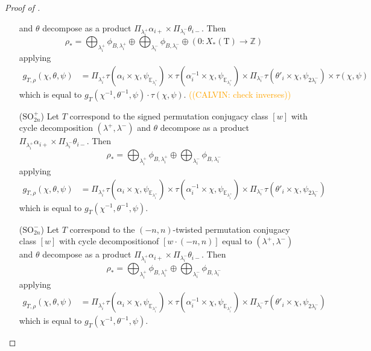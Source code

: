 \documentclass[12pt, reqno]{amsart}
\theoremstyle{definition}
\theoremstyle{definition}
\theoremstyle{definition}
\newcommand{\fieldCharacter}{\psi}
\newcommand{\quadraticExtension}{\mathbb{E}}
\newcommand{\quadraticFieldExtension}[1]{\quadraticExtension_{#1}}
\newcommand{\GaussSumCharacter}[3]{\tau\left(#1 \times #2, #3\right)}
\newcommand{\algebraicGroup}[1]{\boldsymbol{\mathrm{#1}}}
\newcommand{\calvin}[1]{\textcolor{orange}{\sffamily ((CALVIN: #1))}}
\begin{document}
\begin{proof}[Proof of ]
\begin{enumerate}
	and $\theta$ decompose as a product $\Pi_{\lambda_i^+ }\alpha_{i+} \times \Pi_{\lambda_i^-}\theta_{i-}$. Then
	$$\rho_* = \bigoplus_{\lambda_i^+} \phi_{B,\lambda_i^+} \oplus \bigoplus_{\lambda_i^-} \phi_{B,\lambda_i^-} \oplus \left(0:X_*(\algebraicGroup{T}) \to \mathbb{Z}\right)$$
	applying 
	\begin{align*}
		g_{T,\rho}(\chi,\theta,\psi) &= \Pi_{\lambda_i^+} \GaussSumCharacter{\alpha_i}{\chi}{\fieldCharacter_{\quadraticFieldExtension{\lambda_i^+}}} \times \GaussSumCharacter{\alpha_i^{-1}}{\chi}{\fieldCharacter_{\quadraticFieldExtension{\lambda_i^+}}} \times \Pi_{\lambda_i^-} \GaussSumCharacter{\theta'_i}{\chi}{\fieldCharacter_{2\lambda_i^-}} \times \tau(\chi,\psi)
	\end{align*}
	which is equal to $g_{T}(\chi^{-1},\theta^{-1},\psi) \cdot \tau(\chi,\psi)$. \calvin{check inverses}
	\item[($\algebraicGroup{SO}_{2n}^+$)] Let $T$ correspond to the signed permutation conjugacy class $[w]$ with cycle decomposition $(\lambda^+,\lambda^-)$ 
	and $\theta$ decompose as a product $\Pi_{\lambda_i^+ }\alpha_{i+} \times \Pi_{\lambda_i^-}\theta_{i-}$. Then
	$$\rho_* = \bigoplus_{\lambda_i^+} \phi_{B,\lambda_i^+} \oplus \bigoplus_{\lambda_i^-} \phi_{B,\lambda_i^-}$$
	applying 
	\begin{align*}
		g_{T,\rho}(\chi,\theta,\psi) &= \Pi_{\lambda_i^+} \GaussSumCharacter{\alpha_i}{\chi}{\fieldCharacter_{\quadraticFieldExtension{\lambda_i^+}}} \times \GaussSumCharacter{\alpha_i^{-1}}{\chi}{\fieldCharacter_{\quadraticFieldExtension{\lambda_i^+}}} \times \Pi_{\lambda_i^-} \GaussSumCharacter{\theta'_i}{\chi}{\fieldCharacter_{2\lambda_i^-}} 
	\end{align*}
	which is equal to $g_{T}(\chi^{-1},\theta^{-1},\psi)$.
	\item[($\algebraicGroup{SO}_{2n}^-$)] Let $T$ correspond to the $(-n,n)$-twisted permutation conjugacy class $[w]$ with cycle decompositionof $[w \cdot (-n,n)]$ equal to $(\lambda^+,\lambda^-)$ 
	and $\theta$ decompose as a product $\Pi_{\lambda_i^+ }\alpha_{i+} \times \Pi_{\lambda_i^-}\theta_{i-}$. Then
	$$\rho_* = \bigoplus_{\lambda_i^+} \phi_{B,\lambda_i^+} \oplus \bigoplus_{\lambda_i^-} \phi_{B,\lambda_i^-}$$
	applying 
	\begin{align*}
		g_{T,\rho}(\chi,\theta,\psi) &= \Pi_{\lambda_i^+} \GaussSumCharacter{\alpha_i}{\chi}{\fieldCharacter_{\quadraticFieldExtension{\lambda_i^+}}} \times \GaussSumCharacter{\alpha_i^{-1}}{\chi}{\fieldCharacter_{\quadraticFieldExtension{\lambda_i^+}}} \times \Pi_{\lambda_i^-} \GaussSumCharacter{\theta'_i}{\chi}{\fieldCharacter_{2\lambda_i^-}} 
	\end{align*}
	which is equal to $g_{T}(\chi^{-1},\theta^{-1},\psi)$.
\end{enumerate}
   

\end{proof}
\end{document}
